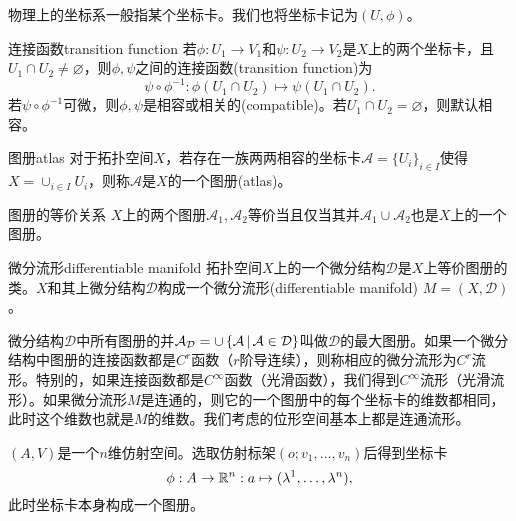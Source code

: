 物理上的坐标系一般指某个坐标卡。我们也将坐标卡记为$(U,\phi)$。
\begin{definition}{连接函数}{transition function}
    若$\phi:U_1\to V_1$和$\psi:U_2\to V_2$是$X$上的两个坐标卡，且$U_1\cap U_2\neq\varnothing$，则$\phi,\psi$之间的连接函数(transition function)为
    \begin{equation}
        \psi\circ\phi^{-1}:\phi(U_1\cap U_2)\mapsto\psi(U_1\cap U_2).
    \end{equation}
    若$\psi\circ\phi^{-1}$可微，则$\phi,\psi$是相容或相关的(compatible)。若$U_1\cap U_2=\varnothing$，则默认相容。
\end{definition}
\begin{definition}{图册}{atlas}
    对于拓扑空间$X$，若存在一族两两相容的坐标卡$\mathcal A=\{U_i\}_{i\in I}$使得$X=\cup_{i\in I}U_i$，则称$\mathcal A$是$X$的一个图册(atlas)。
\end{definition}
\begin{theorem}{图册的等价关系}{}
    $X$上的两个图册$\mathcal A_1,\mathcal A_2$等价当且仅当其并$\mathcal A_1\cup\mathcal A_2$也是$X$上的一个图册。
\end{theorem}
\begin{definition}{微分流形}{differentiable manifold}
    拓扑空间$X$上的一个微分结构$\mathcal D$是$X$上等价图册的类。$X$和其上微分结构$\mathcal D$构成一个微分流形(differentiable manifold) $M=(X,\mathcal D)$。
\end{definition}
微分结构$\mathcal D$中所有图册的并$\mathcal A_{\mathcal D}=\cup\left\{\mathcal A\,\middle\vert\,\mathcal A\in\mathcal D\right\}$叫做$\mathcal D$的最大图册。如果一个微分结构中图册的连接函数都是$C^r$函数（$r$阶导连续），则称相应的微分流形为$C^r$流形。特别的，如果连接函数都是$C^\infty$函数（光滑函数），我们得到$C^\infty$流形（光滑流形）。如果微分流形$M$是连通的，则它的一个图册中的每个坐标卡的维数都相同，此时这个维数也就是$M$的维数。我们考虑的位形空间基本上都是连通流形。
\begin{example}{}{}
    $(A,V)$是一个$n$维仿射空间。选取仿射标架$(o;v_1,\ldots,v_n)$后得到坐标卡
    \[
        \phi:A\to\mathbb R^n:a\mapsto(\lambda^1,\ldots,\lambda^n),
    \]
    此时坐标卡本身构成一个图册。
\end{example}
